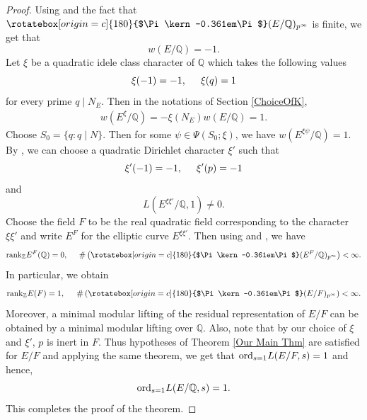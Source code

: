 \documentclass[reqno,10pt]{amsart}
\newcommand{\q}{\mathbb{Q}}
\newcommand{\z}{\mathbb{Z}}
\newcommand{\Varpi}{\rotatebox[origin=c]{180}{$\Pi\kern-0.361em\Pi$}}
\theoremstyle{plain}
\theoremstyle{definition}
\begin{document}
\begin{proof}
    Using \cite[Theorem E]{NekParity} and the fact that $\Varpi(E/\q)_{p^\infty}$ is finite, we get that 
    \begin{equation*}
        w(E/\q) = -1.
    \end{equation*}
    Let $\xi$ be a quadratic idele class character of $\q$ which takes the following values
    \begin{equation*}
        \xi(-1) = -1, \hspace{5mm} \xi(q) = 1
    \end{equation*}
    for every prime $q \mid N_E$. Then in the notations of Section \ref{ChoiceOfK},
    \begin{align*}
        w(E^\xi/\q) = -\xi(N_E)w(E/\q) = 1.
    \end{align*}
    Choose $S_0 = \{q : q \mid N\}$. Then for some $\psi \in \Psi(S_0;\xi)$, we have $w(E^{\xi\psi}/\q) = 1$. By \cite[Theorem B(1)]{FriedbergHoffstein}, we can choose a quadratic Dirichlet character $\xi'$ such that
    \begin{equation*}
        \xi'(-1) = -1, \hspace{5mm} \xi'(p) = -1
    \end{equation*}
    and
    \begin{equation*}
        L(E^{\xi\xi'}/\q,1) \neq 0.
    \end{equation*}
    Choose the field $F$ to be the real quadratic field corresponding to the character $\xi\xi'$ and write $E^F$ for the elliptic curve $E^{\xi\xi'}$. Then using \cite{Kolyvagin} and \cite{GrossZagier}, we have 
    \begin{equation*}
        \mathrm{rank}_\z \hspace{0.1mm} E^F(\q) = 0, \hspace{5mm} \# \left( \Varpi(E^F/\q)_{p^\infty} \right) < \infty.
    \end{equation*}
    In particular, we obtain
    \begin{align*}
        \mathrm{rank}_\z \hspace{0.1mm} E(F) = 1, \hspace{5mm} \# \left( \Varpi(E/F)_{p^\infty} \right) < \infty.
    \end{align*}
    Moreover, a minimal modular lifting of the residual representation of $E/F$ can be obtained by a minimal modular lifting over $\q$. Also, note that by our choice of $\xi$ and $\xi'$, $p$ is inert in $F$. Thus hypotheses of Theorem \ref{Our Main Thm} are satisfied for $E/F$ and 
    applying the same theorem, we get that $\mathrm{ord}_{s=1} \hspace{0.1mm} L(E/F,s) = 1$ and hence, 
    \begin{equation*}
        \mathrm{ord}_{s=1} \hspace{0.1mm} L(E/\q,s) = 1.
    \end{equation*}
    This completes the proof of the theorem.\end{proof}
\end{document}
